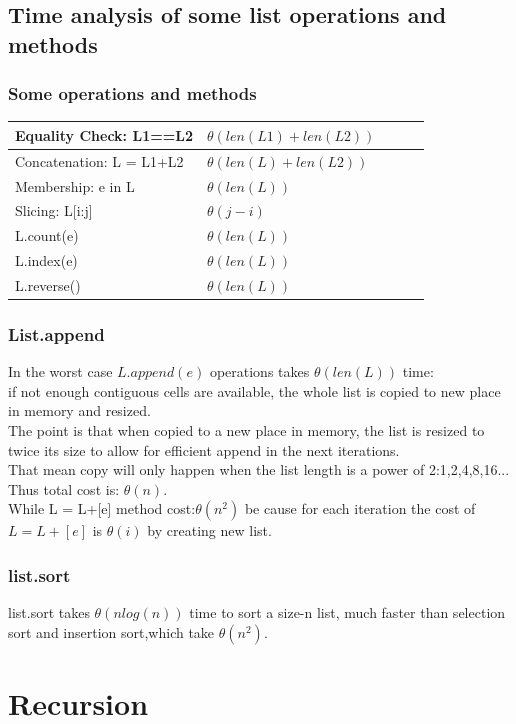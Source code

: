 \documentclass[12pt,oneside]{book}
\begin{document}
\section{Time analysis of some list operations and methods}
\subsection{Some operations and methods}
\begin{tabular}{|l|l|l|l|l|}
	\hline
	Equality Check: L1==L2   & $\theta(len(L1)+len(L2))$ \\ \hline
	Concatenation: L = L1+L2 & $\theta(len(L)+len(L2))$  \\ \hline
	Membership: e in L       & $\theta(len(L))$          \\ \hline
	Slicing: L[i:j]          & $\theta(j-i)$             \\ \hline
	L.count(e)               & $\theta(len(L))$          \\ \hline
	L.index(e)               & $\theta(len(L))$          \\ \hline
	L.reverse()              & $\theta(len(L))$          \\ \hline
\end{tabular}
\subsection{List.append}
In the worst case $L.append(e)$ operations takes $\theta(len(L))$ time:\\
if not enough contiguous cells are available, the whole list is copied to new place in memory and resized.\\
The point is that when copied to a new place in memory, the list is resized to twice its size to allow for efficient append in the next iterations.\\
That mean copy will only happen when the list length is a power of 2:1,2,4,8,16...\\
Thus total cost is: $\boxed{\theta(n)}$.\\
While L = L+[e] method cost:$\theta(n^2)$ be cause for each iteration the cost of $L = L +[e]$ is $\theta(i)$ by creating new list.
\subsection{list.sort}
list.sort takes $\theta(nlog(n))$ time to sort a size-n list, much faster than selection sort and insertion sort,which take $\theta(n^2)$.
\chapter{Recursion}
\end{document}
